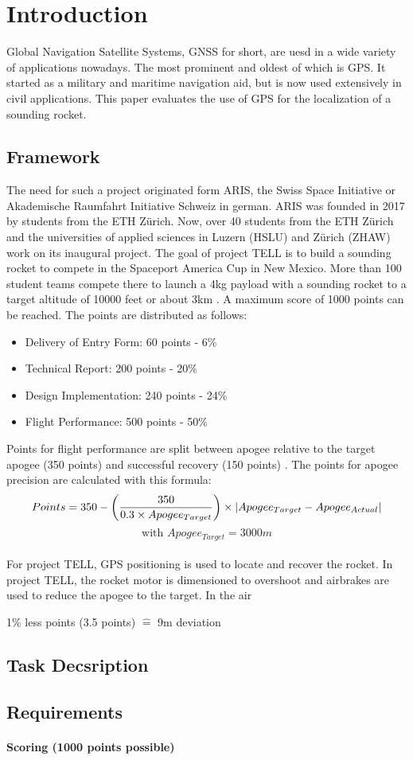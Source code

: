 \chapter{Introduction}

Global Navigation Satellite Systems, GNSS for short, are uesd in a wide variety of applications nowadays.
The most prominent and oldest of which is GPS.
It started as a military and maritime navigation aid, but is now used extensively in civil applications.
This paper evaluates the use of GPS for the localization of a sounding rocket.

\section{Framework}

The need for such a project originated form ARIS, the Swiss Space Initiative or Akademische Raumfahrt Initiative Schweiz in german.
ARIS was founded in 2017 by students from the ETH Zürich.
Now, over 40 students from the ETH Zürich and the universities of applied sciences in Luzern (HSLU) and Zürich (ZHAW) work on its inaugural project.
The goal of project TELL is to build a sounding rocket to compete in the Spaceport America Cup in New Mexico.
More than 100 student teams compete there to launch a 4kg payload with a sounding rocket to a target altitude of 10000 feet or about 3km \cite{aris}.
A maximum score of 1000 points can be reached.
The points are distributed as follows:
\begin{itemize}
 \item Delivery of Entry Form: 60 points - 6\%
 \item Technical Report: 200 points - 20\%
 \item Design Implementation: 240 points - 24\%
 \item Flight Performance: 500 points - 50\%
\end{itemize}

Points for flight performance are split between apogee relative to the target apogee (350 points) and successful recovery (150 points) \cite{sac_rules2017}.
The points for apogee precision are calculated with this formula:
$$ Points = 350 - \left( \frac{350}{0.3 \times Apogee_{Target}} \right) \times \abs{Apogee_{Target} - Apogee_{Actual}} $$
$$ \text{with } Apogee_{Target} = 3000m$$ \\

For project TELL, GPS positioning is used to locate and recover the rocket.
In project TELL, the rocket motor is dimensioned to overshoot and airbrakes are used to reduce the apogee to the target.
In the air

1\% less points (3.5 points) $\widehat{=}$ 9m deviation


\section{Task Decsription}

\section{Requirements}

\subsubsection{Scoring (1000 points possible)}



